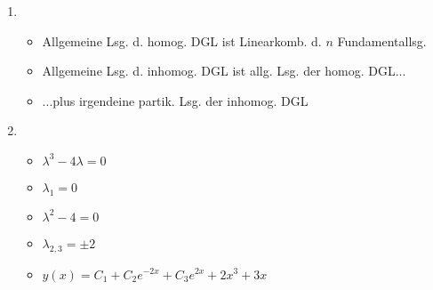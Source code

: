\item
	\begin{enumerate}
	
	\item
		\begin{itemize}
			\item Allgemeine Lsg. d. homog. DGL ist Linearkomb. d. $n$ Fundamentallsg.
			\item Allgemeine Lsg. d. inhomog. DGL ist allg. Lsg. der homog. DGL...
			\item ...plus irgendeine partik. Lsg. der inhomog. DGL
		\end{itemize}
	
	\item
		\begin{itemize}
			\item $ \lambda^3 - 4\lambda = 0$
			\item $ \lambda_1 = 0$
			\item $ \lambda^2 - 4 = 0$
			\item $ \lambda_{2,3} = \pm2$
			\item $ y(x) = C_1 + C_2 e^{-2x} + C_3 e^{2x} + 2x^3 + 3x$
		\end{itemize}
		
	\end{enumerate}
